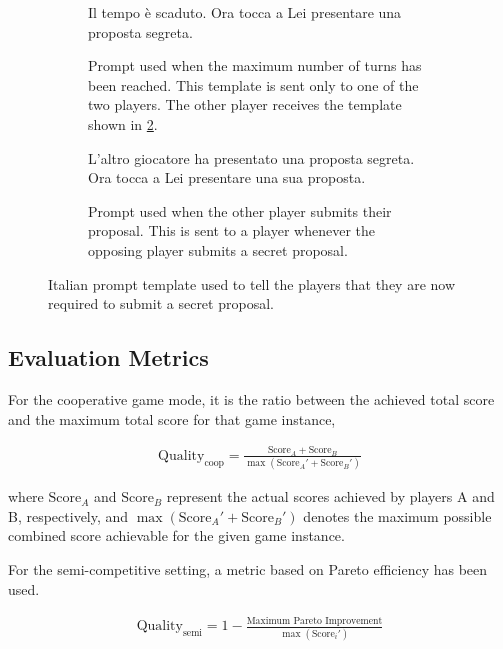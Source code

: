 \documentclass[../main.tex]{subfiles}
\begin{document}
\begin{figure}
\begin{subfigure}[t]{0.48\textwidth}
\begin{prompt}
Il tempo è scaduto. Ora tocca a Lei presentare una proposta segreta.
    \end{prompt}
    \caption{Prompt used when the maximum number of turns has been reached. This template is sent only to one of the two players. The other player receives the template shown in \cref{fig:dond_prompt_template_early_it}.}
    \label{fig:dond_prompt_template_timeout_it}
  \end{subfigure}
  \hfill
  \begin{subfigure}[t]{0.48\textwidth}
    \centering
    \begin{prompt}

L'altro giocatore ha presentato una proposta segreta. Ora tocca a Lei presentare una sua proposta.
    \end{prompt}
    \caption{Prompt used when the other player submits their proposal. This is sent to a player whenever the opposing player submits a secret proposal.}
    \label{fig:dond_prompt_template_early_it}
  \end{subfigure}
  \caption{Italian prompt template used to tell the players that they are now required to submit a secret proposal.}
  \label{fig:dond_prompt_template_all_it}
\end{figure}

\subsection{Evaluation Metrics}\label{subsec:appendix_dond_metric}

For the cooperative game mode, it is the ratio between the achieved total score and the maximum total score for that game instance, 

\begin{align*}
\text{Quality}_{\text{coop}} = \frac{\text{Score}_A + \text{Score}_B}{\max(\text{Score}_A' + \text{Score}_B')}
\end{align*}

where $\text{Score}_A$ and $\text{Score}_B$ represent the actual scores achieved by players A and B, respectively, and $\max(\text{Score}_A' + \text{Score}_B')$ denotes the maximum possible combined score achievable for the given game instance.


For the semi-competitive setting, a metric based on Pareto efficiency has been used.

\begin{align*}
\text{Quality}_{\text{semi}} = 1 - \frac{\text{Maximum Pareto Improvement}}{\max(\text{Score}_i')}
\end{align*}
\end{document}
